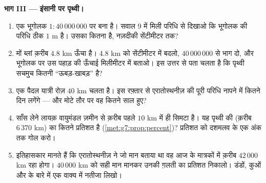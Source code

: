 \begin{problem}
\medskip
\noindent\textbf{भाग III --- इंसानी  पर पृथ्वी।}
\begin{enumerate}[resume]
  \item एक भूगोलक $1 : 40\,000\,000$  पर बना है। सवाल 9 में
        मिली परिधि से दिखाओ कि भूगोलक की परिधि ठीक $1$ m है। उसका
         कितना है, नज़दीकी सेंटीमीटर तक?
  \item मों ब्लां क़रीब $4.8$ km ऊँचा है। $4.8$ km को सेंटीमीटर
        में बदलो, $40\,000\,000$ से भाग दो, और भूगोलक पर उस पहाड़
        की ऊँचाई मिलीमीटर में बताओ। इस उत्तर से पता चलता है कि
        पृथ्वी सचमुच कितनी ``ऊबड़-खाबड़'' है?
  \item एक पैदल यात्री रोज़ $40$ km चलता है। इस रफ़्तार से
        एरातोस्थनीज़ की पूरी परिधि नापने में कितने दिन लगेंगे ---
        और मोटे तौर पर वह कितने साल हुए?
  \item साँस लेने लायक़ वायुमंडल ज़मीन से क़रीब पहले $10$ km में ही
        सिमटा है। यह पृथ्वी की  (क़रीब $6\,370$ km) का
        कितने प्रतिशत है (\cref{met:g7:prop:percent})? प्रतिशत को
        दशमलव के एक अंक तक गोल करो।
  \item इतिहासकार मानते हैं कि एरातोस्थनीज़ ने जो मान बताया था वह
        आज के मात्रकों में क़रीब $42\,000$ km रहा होगा।
        $40\,000$ km को सही मान मानकर उनकी ग़लती का प्रतिशत
        निकालो। डंडों, कुओं और  के बारे में एक वाक्य में
        नतीजा लिखो।
\end{enumerate}
\end{problem}
